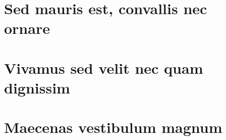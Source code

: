 \documentclass[a4paper, 12pt, twoside, openright]{book}
\begin{document}
\frontmatter







{\small\tableofcontents} 

\mainmatter

\part{Sed mauris est, convallis nec ornare}



\part{Vivamus sed velit nec quam dignissim}


\part{Maecenas vestibulum magnum}




\backmatter

\listoffigures {} %
\listofalgorithms {} %
\cleardoublepage {} {}  %

\end{document}
